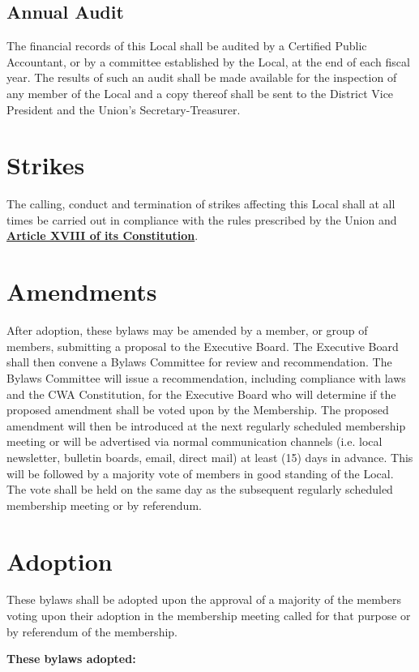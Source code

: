 \documentclass[11pt]{article}
\let\oldhref\href
\renewcommand{\href}[2]{\oldhref{#1}{\bfseries#2}}
\newcommand{\article}[1]{\vspace{.50cm}\section{#1}}
\newcommand{\articlesection}[1]{\vspace{.25cm}\subsection{#1}}
\begin{document}
\articlesection{Annual Audit}
The financial records of this Local shall be audited by a Certified Public Accountant, or by a committee established by the Local, at the end of each fiscal year. The results of such an audit shall be made available for the inspection of any member of the Local and a copy thereof shall be sent to the District Vice President and the Union’s Secretary-Treasurer.

\article{Strikes}
The calling, conduct and termination of strikes affecting this Local shall at all times be carried out in compliance with the rules prescribed by the Union and \href{https://cwa-union.org/for-locals/cwa-constitution\#A18}{Article XVIII of its Constitution}.

\article{Amendments}\label{amendments}
After adoption, these bylaws may be amended by a member, or group of members, submitting a proposal to the Executive Board. The Executive Board shall then convene a Bylaws Committee for review and recommendation. The Bylaws Committee will issue a recommendation, including compliance with laws and the CWA Constitution, for the Executive Board who will determine if the proposed amendment shall be voted upon by the Membership. The proposed amendment will then be introduced at the next regularly scheduled membership meeting or will be advertised via normal communication channels (i.e. local newsletter, bulletin boards, email, direct mail) at least (15) days in advance. This will be followed by a majority vote of members in good standing of the Local. The vote shall be held on the same day as the subsequent regularly scheduled membership meeting or by referendum.

\article{Adoption}
These bylaws shall be adopted upon the approval of a majority of the members voting upon their adoption in the membership meeting called for that purpose or by referendum of the membership.

\vspace{1cm}
\large{\textbf{These bylaws adopted:}} %
\end{document}
